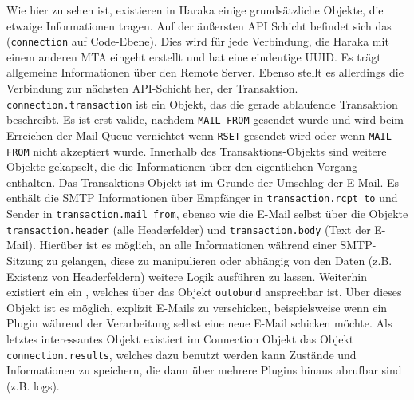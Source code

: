 Wie hier zu sehen ist, existieren in Haraka einige grundsätzliche Objekte, die etwaige Informationen tragen. Auf der äußersten API Schicht befindet sich das  (\verb#connection# auf Code-Ebene). Dies wird für jede Verbindung, die Haraka mit einem anderen MTA eingeht erstellt und hat eine eindeutige UUID. Es trägt allgemeine Informationen über den Remote Server. Ebenso stellt es allerdings die Verbindung zur nächsten API-Schicht her, der Transaktion. \verb#connection.transaction# ist ein Objekt, das die gerade ablaufende Transaktion beschreibt. Es ist erst valide, nachdem \verb#MAIL FROM# gesendet wurde und wird beim Erreichen der Mail-Queue vernichtet wenn \verb#RSET# gesendet wird oder wenn \verb#MAIL FROM# nicht akzeptiert wurde. Innerhalb des Transaktions-Objekts sind weitere Objekte gekapselt, die die Informationen über den eigentlichen Vorgang enthalten. Das Transaktions-Objekt ist im Grunde der Umschlag der E-Mail. Es enthält die SMTP Informationen über Empfänger in \verb#transaction.rcpt_to# und Sender in \verb#transaction.mail_from#, ebenso wie die E-Mail selbst über die Objekte \verb#transaction.header# (alle Headerfelder) und \verb#transaction.body# (Text der E-Mail). Hierüber ist es möglich, an alle Informationen während einer SMTP-Sitzung zu gelangen, diese zu manipulieren oder abhängig von den Daten (z.B. Existenz von Headerfeldern) weitere Logik ausführen zu lassen. Weiterhin existiert ein ein , welches über das Objekt \verb#outobund# ansprechbar ist. Über dieses Objekt ist es möglich, explizit E-Mails zu verschicken, beispielsweise wenn ein Plugin während der Verarbeitung selbst eine neue E-Mail schicken möchte.
Als letztes interessantes Objekt existiert im Connection Objekt das Objekt \verb#connection.results#, welches dazu benutzt werden kann Zustände und Informationen zu speichern, die dann über mehrere Plugins hinaus abrufbar sind (z.B. logs).
